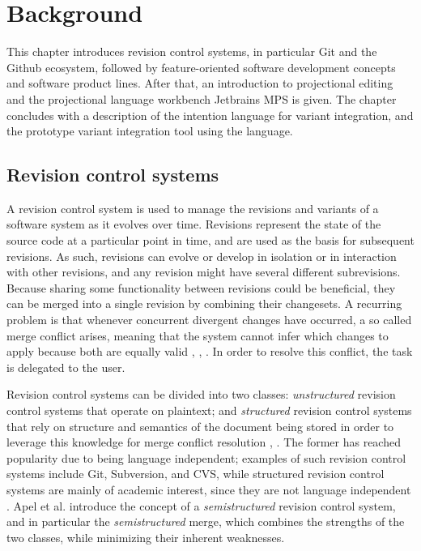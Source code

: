 \chapter{Background}

This chapter introduces revision control systems, in particular Git and the Github ecosystem, followed by feature-oriented software development concepts and software product lines. After that, an introduction to projectional editing and the projectional language workbench Jetbrains MPS is given. The chapter concludes with a description of the intention language for variant integration, and the prototype variant integration tool using the language.

\section{Revision control systems}
A revision control system is used to manage the revisions and variants of a software system as it evolves over time. Revisions represent the state of the source code at a particular point in time, and are used as the basis for subsequent revisions. As such, revisions can evolve or develop in isolation or in interaction with other revisions, and any revision might have several different subrevisions. Because sharing some functionality between revisions could be beneficial, they can be merged into a single revision by combining their changesets. A recurring problem is that whenever concurrent divergent changes have occurred, a so called merge conflict arises, meaning that the system cannot infer which changes to apply because both are equally valid \cite{mens2002}, \cite{apel2011}, \cite{buckley2005}. In order to resolve this conflict, the task is delegated to the user.

Revision control systems can be divided into two classes: \textit{unstructured} revision control systems that operate on plaintext; and \textit{structured} revision control systems that rely on structure and semantics of the document being stored in order to leverage this knowledge for merge conflict resolution \cite{mens2002}, \cite{apel2011}. The former has reached popularity due to being language independent; examples of such revision control systems include Git, Subversion, and CVS, while structured revision control systems are mainly of academic interest, since they are not language independent \cite{apel2011}. Apel et al. \cite{apel2011} introduce the concept of a \textit{semistructured} revision control system, and in particular the \textit{semistructured} merge, which combines the strengths of the two classes, while minimizing their inherent weaknesses.

